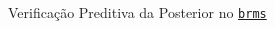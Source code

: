 \begin{frame}{Verificação Preditiva da Posterior no \href{https://paul-buerkner.github.io/brms/}{\texttt{brms}}}
	\begin{columns}
		\begin{column}{0.5\textwidth}
			\begin{figure}
				\centering
				\resizebox{0.8\columnwidth}{!}{}
			\end{figure}
		\end{column}
		\begin{column}{0.5\textwidth}
			\begin{figure}
				\centering
				\resizebox{0.8\columnwidth}{!}{}
			\end{figure}
		\end{column}
	\end{columns}
\end{frame}
